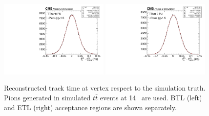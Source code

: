 \begin{figure}[!hbtp]
\centering
\includegraphics[width=0.48\textwidth]{fig/performance/ClusterAndTracks/res_t_pion_BTL.pdf}
\includegraphics[width=0.48\textwidth]{fig/performance/ClusterAndTracks/res_t_pion_ETL.pdf}
\caption{Reconstructed track time at vertex respect to the simulation truth. Pions generated in simulated $t\bar{t}$ events at 14~ are used. BTL (left) and ETL (right) acceptance regions are shown separately.}
\label{fig:trackt0vsgen}
\end{figure}
